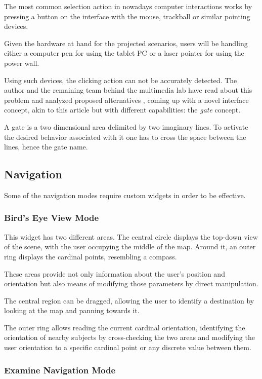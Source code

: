 The most common selection action in nowadays computer interactions works by
pressing a button on the interface with the mouse, trackball or similar pointing devices.

Given the hardware at hand for the projected scenarios,
users will be handling either a computer pen for using the tablet PC or a laser pointer for using the power wall.

Using such devices, the clicking action can not be accurately detected.
The author and the remaining team behind the multimedia lab have read about this problem and analyzed proposed alternatives \cite{CROSSY},
coming up with a novel interface concept, akin to this article but with different capabilities: the \emph{gate} concept.

A gate is a two dimensional area delimited by two imaginary lines. To activate the desired behavior associated
with it one has to cross the space between the lines, hence the gate name.


\subsection{Navigation}

Some of the navigation modes require custom widgets in order to be effective.

\subsubsection{Bird's Eye View Mode}
\label{sec:bev}

This widget has two different areas.
The central circle displays the top-down view of the scene, with the user occupying the middle of the map.
Around it, an outer ring displays the cardinal points, resembling a compass.

These areas provide not only information about the user's position and orientation but also means of
modifying those parameters by direct manipulation.


The central region can be dragged, allowing the user to identify a destination by looking at the map and
panning towards it.

The outer ring allows reading the current cardinal orientation,
identifying the orientation of nearby subjects by cross-checking the two areas and
modifying the user orientation to a specific cardinal point or any discrete value between them.


\subsubsection{Examine Navigation Mode}
\label{sec:examine}

